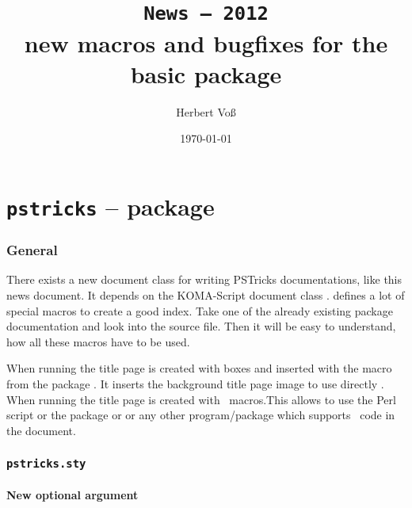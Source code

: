 \documentclass[11pt,english,BCOR10mm,DIV12,bibliography=totoc,parskip=false,smallheadings
    headexclude,footexclude,oneside]{pst-doc}
\let\Lfile\LFile
\begin{document}
\title{\texttt{News -- 2012}\\ \Large new macros and bugfixes for the
basic package }
\author{Herbert Voß}
\date{\today}

\maketitle

\clearpage
\tableofcontents

\clearpage
\part{\texttt{pstricks} -- package}

\section{General}
There exists a new document class  for writing PSTricks documentations,
like this news document. It depends on the KOMA-Script document class .
 defines a lot of special macros to create a good index. Take one of
the already existing package documentation and look into the source file. Then it will be
easy to understand, how all these macros have to be used.

When running  the title page is created with boxes and inserted 
with the macro  from the package . It
inserts the background title page image \Lfile{pst-doc-pdf} to use directly
.
When running  the title page
 is created with \PST\ macros.This allows to use the Perl script  or
the package  or  or any other program/package which
supports \PS\ code in the document.


\section{\texttt{pstricks.sty}}
\subsection{New optional argument}


\end{document}
